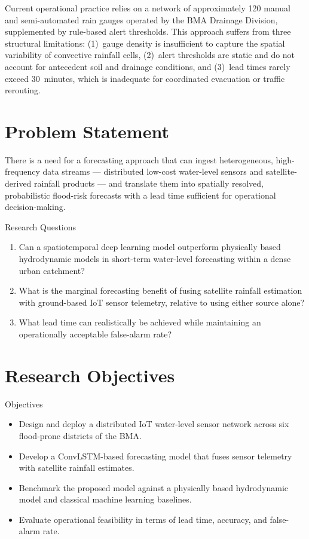 \documentclass[12pt,a4paper]{report}
\begin{document}
\noindent
Current operational practice relies on a network of approximately 120 manual and semi-automated rain gauges operated by the BMA Drainage Division, supplemented by rule-based alert thresholds. This approach suffers from three structural limitations: (1)~gauge density is insufficient to capture the spatial variability of convective rainfall cells, (2)~alert thresholds are static and do not account for antecedent soil and drainage conditions, and (3)~lead times rarely exceed 30~minutes, which is inadequate for coordinated evacuation or traffic rerouting.

\section{Problem Statement}
There is a need for a forecasting approach that can ingest heterogeneous, high-frequency data streams --- distributed low-cost water-level sensors and satellite-derived rainfall products --- and translate them into spatially resolved, probabilistic flood-risk forecasts with a lead time sufficient for operational decision-making.

\begin{chulabox}{Research Questions}
\begin{enumerate}[label=\textbf{RQ\arabic*.}, leftmargin=2.2em]
  \item Can a spatiotemporal deep learning model outperform physically based hydrodynamic models in short-term water-level forecasting within a dense urban catchment?
  \item What is the marginal forecasting benefit of fusing satellite rainfall estimation with ground-based IoT sensor telemetry, relative to using either source alone?
  \item What lead time can realistically be achieved while maintaining an operationally acceptable false-alarm rate?
\end{enumerate}
\end{chulabox}

\section{Research Objectives}
\begin{chulabox}{Objectives}
\begin{itemize}[leftmargin=1.4em]
  \item Design and deploy a distributed IoT water-level sensor network across six flood-prone districts of the BMA.
  \item Develop a ConvLSTM-based forecasting model that fuses sensor telemetry with satellite rainfall estimates.
  \item Benchmark the proposed model against a physically based hydrodynamic model and classical machine learning baselines.
  \item Evaluate operational feasibility in terms of lead time, accuracy, and false-alarm rate.
\end{itemize}
\end{chulabox}
\end{document}
